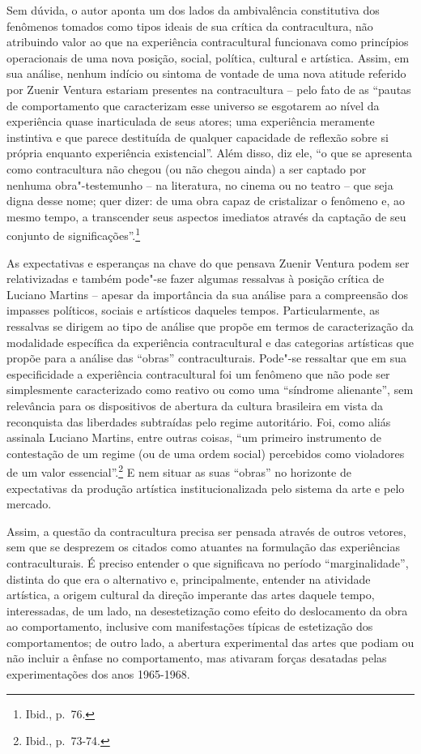 Sem dúvida, o autor aponta um dos lados da ambivalência constitutiva dos
fenômenos tomados como tipos ideais de sua crítica da contracultura, não
atribuindo valor ao que na experiência contracultural funcionava como
princípios operacionais de uma nova posição, social, política, cultural
e artística. Assim, em sua análise, nenhum indício ou sintoma de vontade
de uma nova atitude referido por Zuenir Ventura estariam presentes na
contracultura -- pelo fato de as ``pautas de comportamento que
caracterizam esse universo se esgotarem ao nível da experiência quase
inarticulada de seus atores; uma experiência meramente instintiva e que
parece destituída de qualquer capacidade de reflexão sobre si própria
enquanto experiência existencial''. Além disso, diz ele, ``o que se
apresenta como contracultura não chegou (ou não chegou ainda) a ser
captado por nenhuma obra"-testemunho -- na literatura, no cinema ou no
teatro -- que seja digna desse nome; quer dizer: de uma obra capaz de
cristalizar o fenômeno e, ao mesmo tempo, a transcender seus aspectos
imediatos através da captação de seu conjunto de
significações''.\footnote{Ibid., p.~76.}

As expectativas e esperanças na chave do que pensava Zuenir Ventura
podem ser relativizadas e também pode"-se fazer algumas ressalvas à
posição crítica de Luciano Martins -- apesar da importância da sua
análise para a compreensão dos impasses políticos, sociais e artísticos
daqueles tempos. Particularmente, as ressalvas se dirigem ao tipo de
análise que propõe em termos de caracterização da modalidade específica
da experiência contracultural e das categorias artísticas que propõe
para a análise das ``obras'' contraculturais. Pode"-se ressaltar que em
sua especificidade a experiência contracultural foi um fenômeno que não
pode ser simplesmente caracterizado como reativo ou como uma ``síndrome
alienante'', sem relevância para os dispositivos de abertura da cultura
brasileira em vista da reconquista das liberdades subtraídas pelo regime
autoritário. Foi, como aliás assinala Luciano Martins, entre outras
coisas, ``um primeiro instrumento de contestação de um regime (ou de uma
ordem social) percebidos como violadores de um valor
essencial''.\footnote{Ibid., p.~73-74.} E nem situar as suas ``obras''
no horizonte de expectativas da produção artística institucionalizada
pelo sistema da arte e pelo mercado.

Assim, a questão da contracultura precisa ser pensada através de outros
vetores, sem que se desprezem os citados como atuantes na formulação das
experiências contraculturais. É preciso entender o que significava no
período ``marginalidade'', distinta do que era o alternativo e,
principalmente, entender na atividade artística, a origem cultural da
direção imperante das artes daquele tempo, interessadas, de um lado, na
desestetização como efeito do deslocamento da obra ao comportamento,
inclusive com manifestações típicas de estetização dos comportamentos;
de outro lado, a abertura experimental das artes que podiam ou não
incluir a ênfase no comportamento, mas ativaram forças desatadas pelas
experimentações dos anos 1965-1968.

